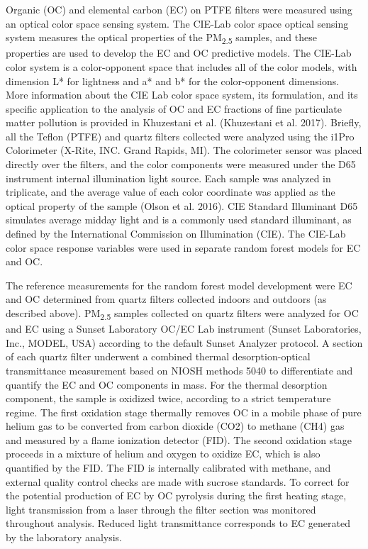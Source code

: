 \documentclass[
  letterpaper,
  DIV=11,
  numbers=noendperiod]{scrartcl}
\begin{document}
Organic (OC) and elemental carbon (EC) on PTFE filters were measured
using an optical color space sensing system. The CIE-Lab color space
optical sensing system measures the optical properties of the
PM\textsubscript{2.5} samples, and these properties are used to develop
the EC and OC predictive models. The CIE-Lab color system is a
color-opponent space that includes all of the color models, with
dimension L* for lightness and a* and b* for the color-opponent
dimensions. More information about the CIE Lab color space system, its
formulation, and its specific application to the analysis of OC and EC
fractions of fine particulate matter pollution is provided in Khuzestani
et al. (Khuzestani et al. 2017). Briefly, all the Teflon (PTFE) and
quartz filters collected were analyzed using the i1Pro Colorimeter
(X-Rite, INC. Grand Rapids, MI). The colorimeter sensor was placed
directly over the filters, and the color components were measured under
the D65 instrument internal illumination light source. Each sample was
analyzed in triplicate, and the average value of each color coordinate
was applied as the optical property of the sample (Olson et al. 2016).
CIE Standard Illuminant D65 simulates average midday light and is a
commonly used standard illuminant, as defined by the International
Commission on Illumination (CIE). The CIE-Lab color space response
variables were used in separate random forest models for EC and OC.

The reference measurements for the random forest model development were
EC and OC determined from quartz filters collected indoors and outdoors
(as described above). PM\textsubscript{2.5} samples collected on quartz
filters were analyzed for OC and EC using a Sunset Laboratory OC/EC Lab
instrument (Sunset Laboratories, Inc., MODEL, USA) according to the
default Sunset Analyzer protocol. A section of each quartz filter
underwent a combined thermal desorption-optical transmittance
measurement based on NIOSH methods 5040 to differentiate and quantify
the EC and OC components in mass. For the thermal desorption component,
the sample is oxidized twice, according to a strict temperature regime.
The first oxidation stage thermally removes OC in a mobile phase of pure
helium gas to be converted from carbon dioxide (CO2) to methane (CH4)
gas and measured by a flame ionization detector (FID). The second
oxidation stage proceeds in a mixture of helium and oxygen to oxidize
EC, which is also quantified by the FID. The FID is internally
calibrated with methane, and external quality control checks are made
with sucrose standards. To correct for the potential production of EC by
OC pyrolysis during the first heating stage, light transmission from a
laser through the filter section was monitored throughout analysis.
Reduced light transmittance corresponds to EC generated by the
laboratory analysis.
\end{document}
